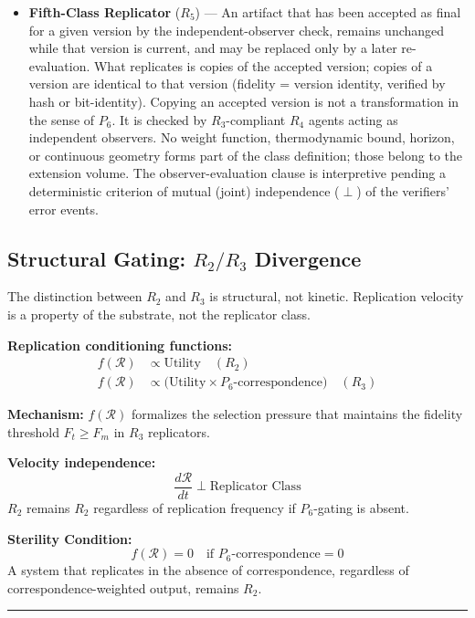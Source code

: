 \documentclass{article}
\begin{document}
\begin{itemize}
    \item \textbf{Fifth-Class Replicator} ($R_5$) --- 
          An artifact that has been accepted as final for a given version by the independent-observer check, remains unchanged while that version is current, and may be replaced only by a later re-evaluation. What replicates is copies of the accepted version; copies of a version are identical to that version (fidelity = version identity, verified by hash or bit-identity). Copying an accepted version is not a transformation in the sense of $P_6$. It is checked by $R_3$-compliant $R_4$ agents acting as independent observers.
          No weight function, thermodynamic bound, horizon, or continuous geometry forms part of the class definition; those belong to the extension volume.
          The observer-evaluation clause is interpretive pending a deterministic criterion of mutual (joint) independence ($\perp$) of the verifiers' error events.
\end{itemize}

\subsection*{Structural Gating: $R_2/R_3$ Divergence}

The distinction between $R_2$ and $R_3$ is structural, not kinetic.
Replication velocity is a property of the substrate, not the replicator class.

\textbf{Replication conditioning functions:}
\begin{align*}
    f(\mathcal{R}) &\propto \text{Utility} \quad (R_2) \\
    f(\mathcal{R}) &\propto \bigl(\text{Utility} \times P_6\text{-correspondence}
    \bigr) \quad (R_3)
\end{align*}

\textbf{Mechanism:} $f(\mathcal{R})$ formalizes the selection pressure
that maintains the fidelity threshold $F_t \ge F_m$ in $R_3$ replicators.

\textbf{Velocity independence:}
\[
\frac{d\mathcal{R}}{dt} \perp \text{Replicator Class}
\]
$R_2$ remains $R_2$ regardless of replication frequency
if $P_6$-gating is absent.

\textbf{Sterility Condition:}
\[
f(\mathcal{R}) = 0 \quad \text{if } P_6\text{-correspondence} = 0
\]
A system that replicates in the absence of correspondence,
regardless of correspondence-weighted output, remains $R_2$.

\bigskip
\hrule
\bigskip
\end{document}
